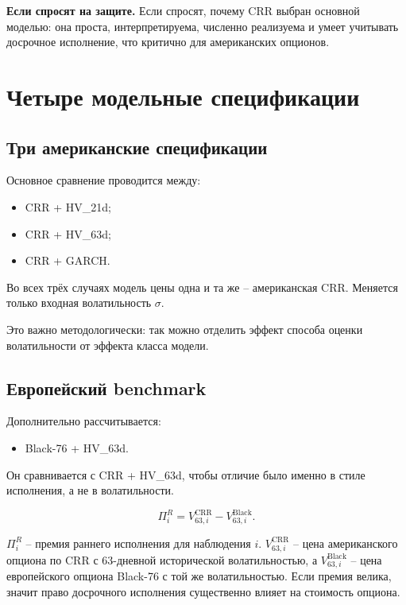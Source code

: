 \documentclass[11pt,a4paper]{article}
\newcommand{\answer}[1]{%
  \vspace{0.15em}
  \noindent\colorbox{softgreen}{%
    \parbox{\dimexpr\linewidth-2\fboxsep\relax}{\textbf{Если спросят на защите.} #1}%
  }\vspace{0.2em}
}
\begin{document}
\answer{Если спросят, почему CRR выбран основной моделью: она проста, интерпретируема, численно реализуема и умеет учитывать досрочное исполнение, что критично для американских опционов.}

\section{Четыре модельные спецификации}

\subsection{Три американские спецификации}

Основное сравнение проводится между:

\begin{itemize}
    \item CRR + HV\_21d;
    \item CRR + HV\_63d;
    \item CRR + GARCH.
\end{itemize}

Во всех трёх случаях модель цены одна и та же -- американская CRR. Меняется только входная волатильность $\sigma$.

Это важно методологически: так можно отделить эффект способа оценки волатильности от эффекта класса модели.

\subsection{Европейский benchmark}

Дополнительно рассчитывается:

\begin{itemize}
    \item Black-76 + HV\_63d.
\end{itemize}

Он сравнивается с CRR + HV\_63d, чтобы отличие было именно в стиле исполнения, а не в волатильности.

\begin{equation}
\Pi^R_i =
V^{\text{CRR}}_{63,i}
-
V^{\text{Black}}_{63,i}.
\end{equation}

$\Pi^R_i$ -- премия раннего исполнения для наблюдения $i$. $V^{\text{CRR}}_{63,i}$ -- цена американского опциона по CRR с 63-дневной исторической волатильностью, а $V^{\text{Black}}_{63,i}$ -- цена европейского опциона Black-76 с той же волатильностью. Если премия велика, значит право досрочного исполнения существенно влияет на стоимость опциона.
\end{document}
